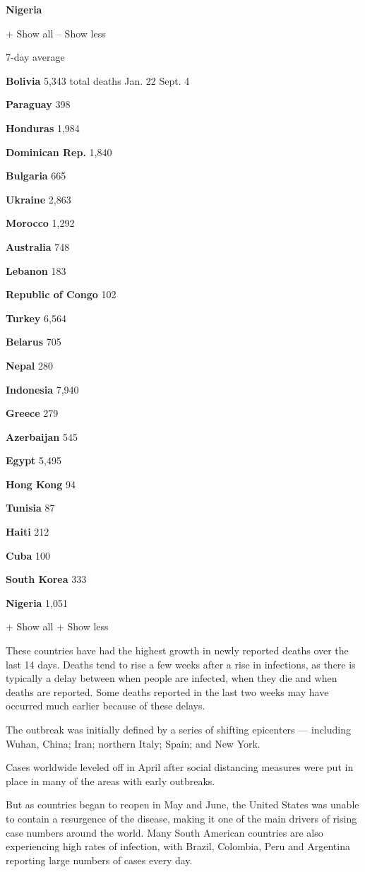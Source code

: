 \textbf{Nigeria}

+ Show all -- Show less

7-day average

\textbf{Bolivia} 5,343 total deaths Jan. 22 Sept. 4

\textbf{Paraguay} 398

\textbf{Honduras} 1,984

\textbf{Dominican Rep.} 1,840

\textbf{Bulgaria} 665

\textbf{Ukraine} 2,863

\textbf{Morocco} 1,292

\textbf{Australia} 748

\textbf{Lebanon} 183

\textbf{Republic of Congo} 102

\textbf{Turkey} 6,564

\textbf{Belarus} 705

\textbf{Nepal} 280

\textbf{Indonesia} 7,940

\textbf{Greece} 279

\textbf{Azerbaijan} 545

\textbf{Egypt} 5,495

\textbf{Hong Kong} 94

\textbf{Tunisia} 87

\textbf{Haiti} 212

\textbf{Cuba} 100

\textbf{South Korea} 333

\textbf{Nigeria} 1,051

+ Show all + Show less

These countries have had the highest growth in newly reported deaths
over the last 14 days. Deaths tend to rise a few weeks after a rise in
infections, as there is typically a delay between when people are
infected, when they die and when deaths are reported. Some deaths
reported in the last two weeks may have occurred much earlier because of
these delays.

The outbreak was initially defined by a series of shifting epicenters
--- including Wuhan, China; Iran; northern Italy; Spain; and New York.

Cases worldwide leveled off in April after social distancing measures
were put in place in many of the areas with early outbreaks.

But as countries began to reopen in May and June, the United States was
unable to contain a resurgence of the disease, making it one of the main
drivers of rising case numbers around the world. Many South American
countries are also experiencing high rates of infection, with Brazil,
Colombia, Peru and Argentina reporting large numbers of cases every day.

